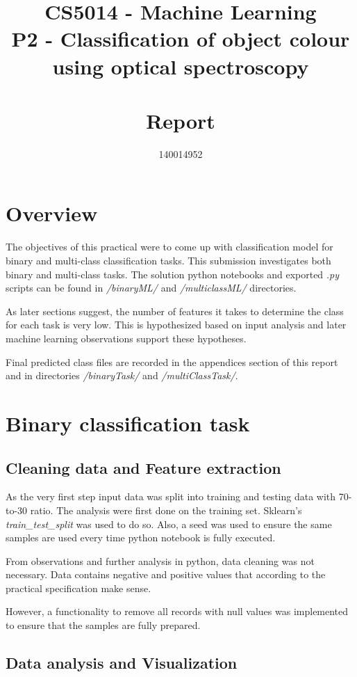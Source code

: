 \documentclass[11pt]{article}
\title{CS5014 - Machine Learning 
\\ \vspace{5mm} \Large P2 - Classification of object colour 
\\ using optical spectroscopy 
\\~\\ Report}
\author{140014952}
\begin{document}
	\maketitle

	\section{Overview}
		The objectives of this practical were to come up with classification model for binary and multi-class classification tasks. This submission investigates both binary and multi-class tasks. The solution python notebooks and exported \textit{.py} scripts can be found in \textit{/binaryML/} and \textit{/multiclassML/} directories.

		As later sections suggest, the number of features it takes to determine the class for each task is very low. This is hypothesized based on input analysis and later machine learning observations support these hypotheses. 

		Final predicted class files are recorded in the appendices section of this report and in directories \textit{/binaryTask/} and \textit{/multiClassTask/}.
	
	\clearpage
	\section{Binary classification task}

		\subsection{Cleaning data and Feature extraction}
			As the very first step input data was split into training and testing data with 70-to-30 ratio. The analysis were first done on the training set. Sklearn's \textit{train\_test\_split} was used to do so. Also, a seed was used to ensure the same samples are used every time python notebook is fully executed.

			From observations and further analysis in python, data cleaning was not necessary. Data contains negative and positive values that according to the practical specification make sense. 

			However, a functionality to remove all records with null values was implemented to ensure that the samples are fully prepared.

		\subsection{Data analysis and Visualization}
\end{document}
